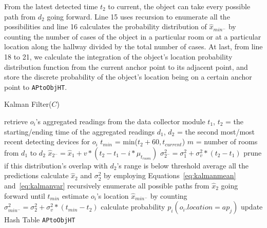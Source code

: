\documentclass[12pt]{report}
\begin{document}
From the latest detected time \(t_2\) to current, the object can
take every possible path from \(d_2\) going forward.  Line 15 uses
recursion to enumerate all the possibilities and line 16
calculates the probability distribution of \(\hat{x}_{min^-}\) by
counting the number of cases of the object in a particular room or
at a particular location along the hallway divided by the total
number of cases.  At last, from line 18 to 21, we calculate the
integration of the object's location probability distribution
function from the current anchor point to its adjacent point, and
store the discrete probability of the object's location being on a
certain anchor point to \texttt{APtoObjHT}.
\begin{algorithm}[!t]
  \caption{Kalman Filter(\(C\))}
  \label{alg:kalman-filter}
  \small
  \begin{algorithmic}[1]
    \STATE retrieve \(o_i\)'s aggregated readings from the data collector module
    \STATE \(t_1\), \(t_2\) = the starting/ending time of the aggregated readings
    \STATE \(d_1\), \(d_2\) = the second most/most recent detecting devices for \(o_i\)
    \STATE \(t_{min}\) = min(\(t_2+60, t_{current}\))
    \STATE \(m\) = number of rooms from \(d_1\) to \(d_2\)
    \STATE \(\hat{x}_{2^-}=\hat{x}_1+v*(t_2-t_1-i*\mu_{t_{room}})\)
    \STATE \(\sigma_{2^-}^2=\sigma_1^2+\sigma_v^2*(t_2-t_1)\)
    \STATE prune if this distribution's overlap with \(d_2\)'s range is below threshold
    \ENDFOR
    \STATE average all the predictions
    \STATE calculate \(\hat{x}_2\) and \(\sigma_2^2\) by employing Equations~\ref{eq:kalmanmean} and~\ref{eq:kalmanvar}
    \STATE recursively enumerate all possible paths from \(\hat{x}_2\) going forward until \(t_{min}\)
    \STATE estimate \(o_i\)'s location \(\hat{x}_{min^-}\) by counting
    \STATE \(\sigma_{min^-}^2=\sigma_2^2+\sigma_v^2*(t_{min}-t_2)\)
    \STATE calculate probability \(p_i(o_i.location=ap_j)\)
    \STATE update Hash Table \texttt{APtoObjHT}
    \ENDFOR
    \ENDFOR
  \end{algorithmic}
\end{algorithm}
\end{document}
